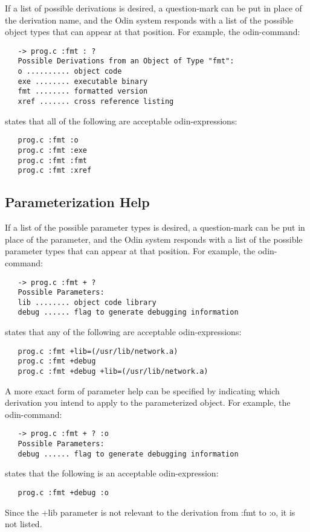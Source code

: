 If a list of possible derivations is desired,
a question-mark can be put in place of the derivation name,
and the Odin system responds with a list of the
possible object types that can appear at that position.
For example, the odin-command:
\begin{verbatim}
   -> prog.c :fmt : ?
   Possible Derivations from an Object of Type "fmt":
   o .......... object code
   exe ........ executable binary
   fmt ........ formatted version
   xref ....... cross reference listing
\end{verbatim}
states that all of the following are acceptable odin-expressions:
\begin{verbatim}
   prog.c :fmt :o
   prog.c :fmt :exe
   prog.c :fmt :fmt
   prog.c :fmt :xref
\end{verbatim}

\subsection{Parameterization Help}

If a list of the possible parameter types is desired,
a question-mark can be put in place of the parameter,
and the Odin system responds with a list of the possible
parameter types that can appear at that position.
For example, the odin-command:
\begin{verbatim}
   -> prog.c :fmt + ?
   Possible Parameters:
   lib ........ object code library
   debug ...... flag to generate debugging information
\end{verbatim}
states that any of the following are acceptable odin-expressions:
\begin{verbatim}
   prog.c :fmt +lib=(/usr/lib/network.a)
   prog.c :fmt +debug
   prog.c :fmt +debug +lib=(/usr/lib/network.a)
\end{verbatim}

A more exact form of parameter help can be specified by indicating
which derivation you intend to apply to the parameterized object.
For example, the odin-command:
\begin{verbatim}
   -> prog.c :fmt + ? :o
   Possible Parameters:
   debug ...... flag to generate debugging information
\end{verbatim}
states that the following is an acceptable odin-expression:
\begin{verbatim}
   prog.c :fmt +debug :o
\end{verbatim}
Since the {\ex +lib} parameter is not relevant to the derivation
from {\ex :fmt} to {\ex :o}, it is not listed.

